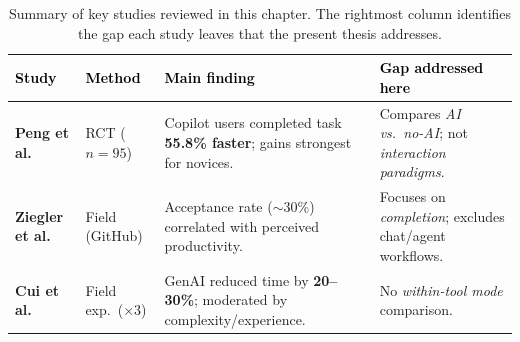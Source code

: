 \begin{table}[H]

  \centering

  \caption[Summary of Key Empirical Studies]{Summary of key studies reviewed in this chapter. The rightmost column identifies the gap each study leaves that the present thesis addresses.}

  \label{tab:literature-summary}

  \footnotesize

  \setlength{\tabcolsep}{3pt}

  \renewcommand{\arraystretch}{1.0}


  \begin{tabularx}{\textwidth}{>{\raggedright\arraybackslash}p{2.8cm} >{\raggedright\arraybackslash}p{2cm} X >{\raggedright\arraybackslash}p{4cm}}

    \toprule

    \rowcolor{accentblue}

    \textcolor{black}{\textbf{Study}} & \textcolor{black}{\textbf{Method}} & \textcolor{black}{\textbf{Main finding}} & \textcolor{black}{\textbf{Gap addressed here}} \\

    \midrule

    \textbf{Peng et al.} \parencite{peng2023copilot} &

    RCT ($n=95$) &

    Copilot users completed task \textbf{55.8\% faster}; gains strongest for novices. &

    Compares \emph{AI vs.\ no-AI}; not \emph{interaction paradigms}. \\

    \textbf{Ziegler et al.} \parencite{ziegler2024measuring} &

    Field (GitHub) &

    Acceptance rate ($\sim$30\%) correlated with perceived productivity. &

    Focuses on \emph{completion}; excludes chat/agent workflows. \\

    \textbf{Cui et al.} \parencite{cui2025effectsgenai} &

    Field exp.\ ($\times 3$) &

    GenAI reduced time by \textbf{20--30\%}; moderated by complexity/experience. &

    No \emph{within-tool mode} comparison. \\


\end{tabularx}
\end{table}
